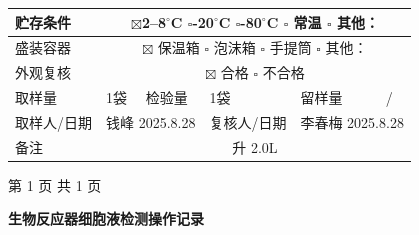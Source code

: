 \documentclass[UTF8,10pt,a4paper,fontset=fandol]{ctexart}
\newcommand{\fieldvalue}[1]{#1}
\newcommand{\handwritten}[1]{#1}
\begin{document}
\begin{tabularx}{\textwidth}{|p{}|p{}|p{}|p{}|p{}|X|}
贮存条件 &
\multicolumn{5}{c|}{
\fieldvalue{$\boxtimes$2--8$^\circ$C}\quad
$\square$-20$^\circ$C\quad
$\square$-80$^\circ$C\quad
$\square$ 常温\quad
$\square$ 其他：\underline{\hspace{3em}}}
\\ \hline

盛装容器 &
\multicolumn{5}{c|}{
\fieldvalue{$\boxtimes$ 保温箱}\quad
$\square$ 泡沫箱\quad
$\square$ 手提筒\quad
$\square$ 其他：\underline{\hspace{3em}}}
\\ \hline

外观复核 &
\multicolumn{5}{c|}{
\fieldvalue{$\boxtimes$ 合格}\quad
$\square$ 不合格
}
\\ \hline

取样量 &
\fieldvalue{1袋}
&
检验量 &
\fieldvalue{1袋}
&
留样量 &
\fieldvalue{/}
\\ \hline

取样人/日期 &
\multicolumn{2}{c|}{
\fieldvalue{\handwritten{钱峰 2025.8.28}}
} &
复核人/日期 &
\multicolumn{2}{c|}{
\fieldvalue{\handwritten{李春梅 2025.8.28}}
}
\\ \hline

备注 &
\multicolumn{5}{c|}{
\fieldvalue{\handwritten{升 2.0L}}
}
\\ \hline
\end{tabularx}

\normalsize
\begin{center}
第 1 页 共 1 页
\end{center}

\newpage

\begin{center}
\textbf{生物反应器细胞液检测操作记录}
\end{center}
\end{document}
